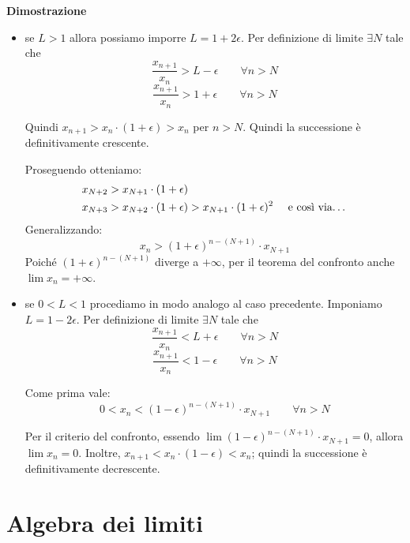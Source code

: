 \textbf{Dimostrazione}
\begin{itemize}
\item se $L > 1$ allora possiamo imporre $L = 1 + 2\epsilon$. Per definizione di limite $\exists N$ tale che 
\begin{equation*}
\frac{x_{n+1}}{x_n} > L - \epsilon \qquad \forall n > N
\end{equation*}
\begin{equation*}
\frac{x_{n+1}}{x_n} > 1 + \epsilon \qquad \forall n > N
\end{equation*}

Quindi $x_{n+1} > x_n \cdot (1+\epsilon) > x_n$ per $n > N$. Quindi la successione è definitivamente crescente.

Proseguendo otteniamo:
\begin{align*}
x_{N+2} &> x_{N+1} \cdot (1+\epsilon) \\
x_{N+3} &> x_{N+2} \cdot (1+\epsilon) > x_{N+1} \cdot (1+\epsilon)^2 \quad \text { e così via\dots}
\end{align*}
Generalizzando:
\begin{equation*}
x_n > (1+\epsilon)^{n-(N+1)} \cdot x_{N+1}
\end{equation*}
Poiché $(1+\epsilon)^{n-(N+1)}$ diverge a $+\infty$, per il teorema del confronto anche $\lim x_n = +\infty$.

\item se $0 < L < 1$ procediamo in modo analogo al caso precedente. Imponiamo $L = 1 - 2\epsilon$. Per definizione di limite $\exists N$ tale che
\begin{equation*}
\frac{x_{n+1}}{x_n} < L + \epsilon \qquad \forall n > N
\end{equation*}
\begin{equation*}
\frac{x_{n+1}}{x_n} < 1 - \epsilon \qquad \forall n > N
\end{equation*}

Come prima vale:
\begin{equation*}
0 < x_n < (1-\epsilon)^{n-(N+1)} \cdot x_{N+1} \qquad \forall n>N
\end{equation*}

Per il criterio del confronto, essendo $\lim (1-\epsilon)^{n-(N+1)} \cdot x_{N+1} = 0$, allora $\lim x_n = 0$. Inoltre, $x_{n+1} < x_n \cdot (1 - \epsilon) < x_n$; quindi la successione è definitivamente decrescente.
\end{itemize}


\section{Algebra dei limiti }


